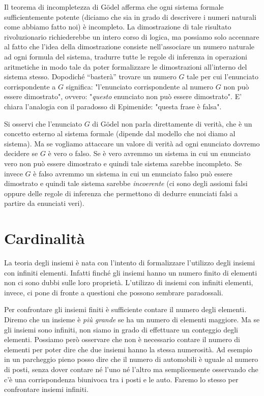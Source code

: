 \documentclass[italian,a4paper,hidelinks,headinclude]{scrartcl}
\newcommand{\myemph}[1]{\emph{#1}\marginpar{#1}}
\begin{document}
Il teorema di incompletezza di G\"odel afferma che ogni
sistema formale sufficientemente potente (diciamo che sia in grado di
descrivere i numeri naturali come abbiamo fatto noi) è incompleto.
La dimostrazione di tale risultato rivoluzionario richiederebbe un intero
corso di logica, ma possiamo solo accennare al fatto che l'idea della
dimostrazione consiste nell'associare un numero naturale ad ogni formula
del sistema, tradurre tutte le regole di inferenza in operazioni aritmetiche
in modo tale da poter formalizzare le dimostrazioni all'interno del sistema
stesso. Dopodiché ``basterà'' trovare un numero $G$ tale per cui
l'enunciato corrispondente a $G$ significa:
"l'enunciato corrispondente al numero $G$ non può essere dimostrato",
ovvero: "\emph{questo} enunciato non può essere dimostrato".
E' chiara l'analogia con il paradosso di Epimenide: "questa frase è falsa".

Si osservi che l'enunciato $G$ di G\"odel non parla direttamente di verità,
che è un concetto esterno al sistema formale
(dipende dal modello che noi diamo al sistema).
Ma se vogliamo attaccare un valore di verità ad ogni enunciato dovremo decidere
se $G$ è vero o falso. Se è vero avremmo un sistema in cui un enunciato vero
non può essere dimostrato e quindi tale sistema sarebbe incompleto.
Se invece $G$ è falso avremmo un sistema in cui un enunciato falso può essere
dimostrato e quindi tale sistema sarebbe \myemph{incoerente} (ci sono degli assiomi
falsi oppure delle regole di inferenza che permettono di dedurre enunciati falsi
a partire da enunciati veri).

\section{Cardinalità}

La teoria degli insiemi è nata con l'intento di formalizzare l'utilizzo degli
insiemi con infiniti elementi. Infatti finché gli insiemi hanno un numero finito
di elementi non ci sono dubbi sulle loro proprietà. L'utilizzo di insiemi con
infiniti elementi, invece, ci pone di fronte a questioni che possono sembrare
paradossali.

Per confrontare gli insiemi finiti è sufficiente contare il numero degli elementi.
Diremo che un insieme è \emph{più grande} se ha un numero di elementi maggiore.
Ma se gli insiemi sono infiniti, non siamo in grado di effettuare un conteggio
degli elementi. Possiamo però osservare che non è necessario contare il numero
di elementi per poter dire che due insiemi hanno la stessa numerosità.
Ad esempio in un parcheggio pieno posso dire che il numero di automobili
è uguale al numero di posti, senza dover contare né l'uno né l'altro ma semplicemente
osservando che c'è una corrispondenza biunivoca tra i posti e le auto. Faremo
lo stesso per confrontare insiemi infiniti.
\end{document}
